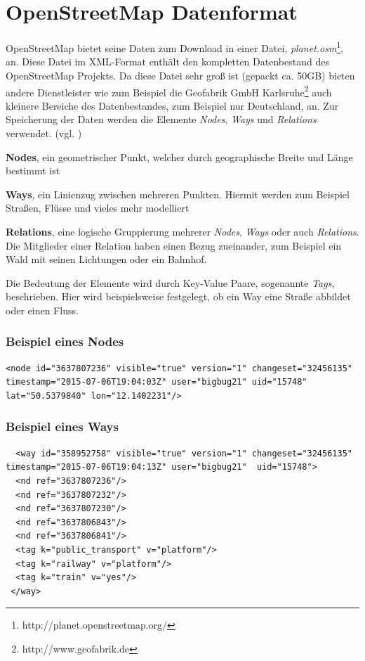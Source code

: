 \section{OpenStreetMap Datenformat}
\label{sec:appendix:osm:data}
OpenStreetMap bietet seine Daten zum Download in einer Datei, \textit{planet.osm}\footnote{http://planet.openstreetmap.org/}, an. Diese Datei im XML-Format enthält den kompletten Datenbestand des OpenStreetMap Projekts. 
Da diese Datei sehr groß ist (gepackt ca. 50GB) bieten andere Dienstleister wie zum Beispiel die Geofabrik GmbH Karlsruhe\footnote{http://www.geofabrik.de} auch kleinere Bereiche des Datenbestandes, zum Beispiel nur Deutschland, an.
Zur Speicherung der Daten werden die Elemente \textit{Nodes}, \textit{Ways} und \textit{Relations} verwendet. (vgl. \cite{WEB:OSM:Primitives:2015})
\begin{compactitem}
  \item \textbf{Nodes}, ein geometrischer Punkt, welcher durch geographische Breite und Länge bestimmt ist
  \item \textbf{Ways}, ein Linienzug zwischen mehreren Punkten. Hiermit werden zum Beispiel Straßen, Flüsse und vieles mehr modelliert
  \item \textbf{Relations}, eine logische Gruppierung mehrerer \textit{Nodes}, \textit{Ways} oder auch \textit{Relations}. Die Mitglieder einer Relation haben einen Bezug zueinander, zum Beispiel ein Wald mit seinen Lichtungen oder ein Bahnhof. 
\end{compactitem}
Die Bedeutung der Elemente wird durch Key-Value Paare, sogenannte \textit{Tags}, beschrieben. Hier wird beispielsweise festgelegt, ob ein Way eine Straße abbildet oder einen Fluss.

\subsubsection{Beispiel eines Nodes}

\lstset{
  numbers=none,
  caption=Beispiel eines Nodes aus planet.osm,
  label=
}
\begin{lstlisting}
<node id="3637807236" visible="true" version="1" changeset="32456135" timestamp="2015-07-06T19:04:03Z" user="bigbug21" uid="15748" lat="50.5379840" lon="12.1402231"/>
\end{lstlisting}

\subsubsection{Beispiel eines Ways}
\lstset{
  numbers=none,
  caption=Beispiel eines Ways aus planet.osm,
  label=
}
\begin{lstlisting}
  <way id="358952758" visible="true" version="1" changeset="32456135" timestamp="2015-07-06T19:04:13Z" user="bigbug21"  uid="15748">
  <nd ref="3637807236"/>
  <nd ref="3637807232"/>
  <nd ref="3637807230"/>
  <nd ref="3637806843"/>
  <nd ref="3637806841"/>
  <tag k="public_transport" v="platform"/>
  <tag k="railway" v="platform"/>
  <tag k="train" v="yes"/>
 </way>
\end{lstlisting}

